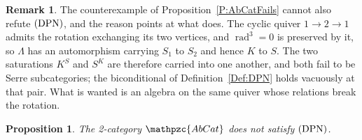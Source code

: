 \documentclass[reqno,a4paper]{amsart}
\numberwithin{equation}{section}
\theoremstyle{plain}
\newtheorem{proposition}[subsection]{Proposition}
\theoremstyle{definition}
\newtheorem{remark}[subsection]{Remark}
\def\nameit#1{\textrm{#1}~}
\def\prox{\nameit{Proposition}}
\def\defx{\nameit{Definition}}
\newcommand{\catfont}[1]{\ensuremath{\mathpzc{#1}}\xspace}
\newcommand{\AbCat}{\catfont{AbCat}}
\renewcommand{\1}{\onecat{1}}
\newcommand{\DPN}{\textup{(DPN)}}
\begin{document}
\begin{remark}\label{Rem NSD Symmetric}
	The counterexample of \prox\ref{P:AbCatFails} cannot also refute \(\DPN\), and the reason points at what does. The cyclic quiver \(1\to2\to1\) admits the rotation exchanging its two vertices, and \(\operatorname{rad}^{3}=0\) is preserved by it, so \(\Lambda\) has an automorphism carrying \(S_{1}\) to \(S_{2}\) and hence \(K\) to \(S\). The two saturations \(K^{S}\) and \(S^{K}\) are therefore carried into one another, and both fail to be Serre subcategories; the biconditional of \defx\ref{Def:DPN} holds vacuously at that pair. What is wanted is an algebra on the same quiver whose relations break the rotation.
\end{remark}

\begin{proposition}\label{P:AbCatNotDPN}
	The 2-category \(\AbCat\) does not satisfy \(\DPN\).
\end{proposition}
\end{document}
